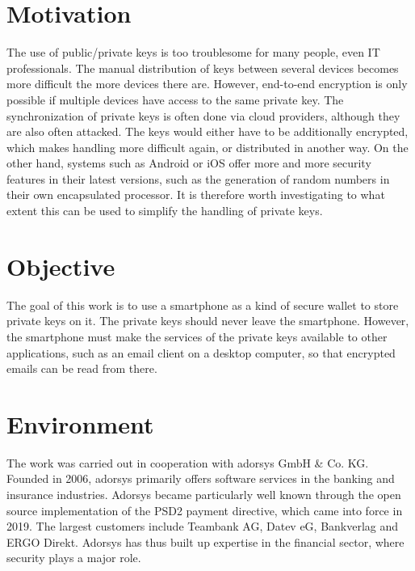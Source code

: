 \documentclass[12pt,oneside,a4paper,parskip]{scrbook}
\begin{document}
\section{Motivation}

The use of public/private keys is too troublesome for many people, even IT professionals. The manual distribution of keys between several devices becomes more difficult the more devices there are. However, end-to-end encryption is only possible if multiple devices have access to the same private key. The synchronization of private keys is often done via cloud providers, although they are also often attacked. The keys would either have to be additionally encrypted, which makes handling more difficult again, or distributed in another way. On the other hand, systems such as Android or iOS offer more and more security features in their latest versions, such as the generation of random numbers in their own encapsulated processor. It is therefore worth investigating to what extent this can be used to simplify the handling of private keys.

\section{Objective}

The goal of this work is to use a smartphone as a kind of secure wallet to store private keys on it. The private keys should never leave the smartphone. However, the smartphone must make the services of the private keys available to other applications, such as an email client on a desktop computer, so that encrypted emails can be read from there.

\section{Environment}

The work was carried out in cooperation with adorsys GmbH \& Co. KG. Founded in 2006, adorsys primarily offers software services in the banking and insurance industries. Adorsys became particularly well known through the open source implementation of the PSD2 payment directive, which came into force in 2019. The largest customers include Teambank AG, Datev eG, Bankverlag and ERGO Direkt. Adorsys has thus built up expertise in the financial sector, where security plays a major role. 

\end{document}
